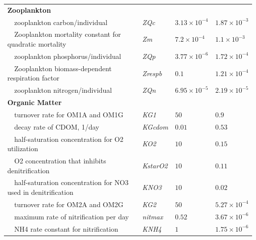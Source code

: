 \documentclass[letterpaper,12pt,oneside]{article}\usepackage[]{graphicx}\usepackage[]{color}
\begin{document}
\begin{table}[!tbp]
{\begin{center}
\begin{tabular}{llll}
\hline
{\bfseries Zooplankton}&&&\tabularnewline
~~zooplankton carbon/individual&\textit{ZQc}&$3.13\times 10^{-4}$&$1.87\times 10^{-3}$\tabularnewline
~~Zooplankton mortality constant for quadratic mortality&\textit{Zm}&$7.2\times 10^{-4}$&$1.1\times 10^{-3}$\tabularnewline
~~zooplankton phosphorus/individual&\textit{ZQp}&$3.77\times 10^{-6}$&$1.72\times 10^{-4}$\tabularnewline
~~Zooplankton biomass-dependent respiration factor&\textit{Zrespb}&$0.1$&$1.21\times 10^{-4}$\tabularnewline
~~zooplankton nitrogen/individual&\textit{ZQn}&$6.95\times 10^{-5}$&$2.19\times 10^{-5}$\tabularnewline
\hline
{\bfseries Organic Matter}&&&\tabularnewline
~~turnover rate for OM1A and OM1G&\textit{KG1}&$50$&$0.9$\tabularnewline
~~decay rate of CDOM, 1/day&\textit{KGcdom}&$0.01$&$0.53$\tabularnewline
~~half-saturation concentration for O2 utilization&\textit{KO2}&$10$&$0.15$\tabularnewline
~~O2 concentration that inhibits denitrification&\textit{KstarO2}&$10$&$0.11$\tabularnewline
~~half-saturation concentration for NO3 used in denitrification&\textit{KNO3}&$10$&$0.02$\tabularnewline
~~turnover rate for OM2A and OM2G&\textit{KG2}&$50$&$5.27\times 10^{-4}$\tabularnewline
~~maximum rate of nitrification per day&\textit{nitmax}&$0.52$&$3.67\times 10^{-6}$\tabularnewline
~~NH4 rate constant for nitrification&\textit{KNH4}&$1$&$1.75\times 10^{-6}$\tabularnewline
\hline
\end{tabular}\end{center}}

\end{table}
\end{document}
